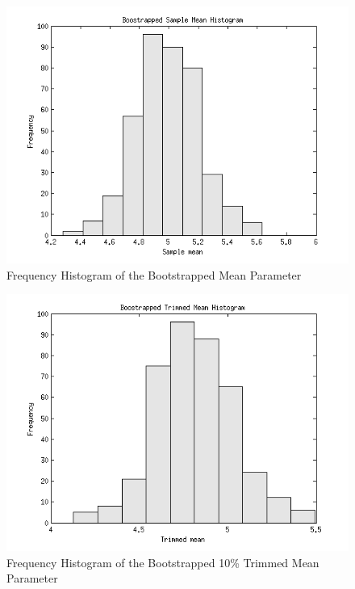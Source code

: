 \documentclass[12pt,a4paper]{article}
\begin{document}
\begin{figure}[ht!]
\begin{center}
\includegraphics[scale=.8]{inClass5_mhist.png}
\caption{Frequency Histogram of the Bootstrapped Mean Parameter}
\label{inclass5 fig2}
\end{center}
\end{figure}
\FloatBarrier

\begin{figure}[ht!]
\begin{center}
\includegraphics[scale=.8]{inClass5_thist.png}
\caption{Frequency Histogram of the Bootstrapped 10\% Trimmed Mean Parameter}
\label{inclass5 fig3}
\end{center}
\end{figure}
\FloatBarrier
\end{document}
